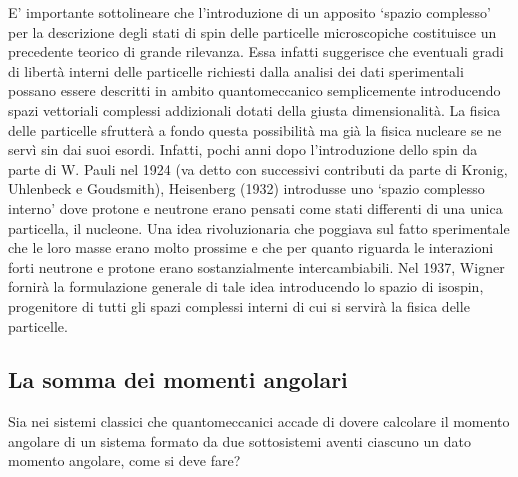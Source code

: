 E’ importante sottolineare che l’introduzione di un apposito ‘spazio complesso’ per la descrizione degli stati di spin
delle particelle microscopiche costituisce un precedente teorico di grande rilevanza.
Essa infatti suggerisce che eventuali gradi di libertà interni delle particelle richiesti dalla analisi dei dati sperimentali
possano essere descritti in ambito quantomeccanico semplicemente introducendo spazi vettoriali complessi addizionali dotati della giusta dimensionalità.
La fisica delle particelle sfrutterà a fondo questa possibilità ma già la fisica nucleare se ne servì sin dai suoi esordi.
Infatti, pochi anni dopo l’introduzione dello spin da parte di W. Pauli nel 1924 (va detto con successivi contributi da parte di Kronig, Uhlenbeck e Goudsmith),
Heisenberg (1932) introdusse uno ‘spazio complesso interno’ dove protone e neutrone erano pensati come stati differenti di una unica particella, il nucleone.
Una idea rivoluzionaria che poggiava sul fatto sperimentale che le loro masse erano molto prossime e che per quanto riguarda le interazioni forti neutrone e protone erano sostanzialmente intercambiabili.
Nel 1937, Wigner fornirà la formulazione generale di tale idea introducendo lo spazio di isospin, progenitore di tutti gli spazi complessi interni di cui si servirà la fisica delle particelle.

\subsection{La somma dei momenti angolari}\label{sec:somma-dei-momenti-angolari}

Sia nei sistemi classici che quantomeccanici accade di dovere calcolare
il momento angolare di un sistema formato da due sottosistemi aventi
ciascuno un dato momento angolare, come si deve fare?

